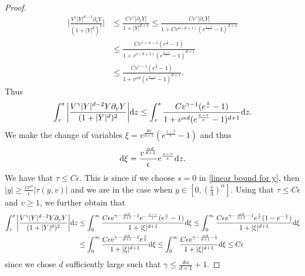 \documentclass[11pt]{article}
\numberwithin{equation}{section}
\newcommand{\der}{\textup{d}}
\begin{document}
\begin{proof}
\begin{align*}
 \bigg|\frac{V^{\gamma}|Y|^{d-1}\partial_{v}Y}{(1+|Y|^{d})^{2}}\bigg|&\leq  \frac{C  v^{\gamma}|\partial_{v}Y|}{1+|Y|^{d+1}}\leq  \frac{C  v^{\gamma}|\partial_{v}Y|}{1+C v^{\alpha (d+1)}(e^{\frac{s-\tau}{\epsilon}}-1)^{d+1}}\\
 &\leq \frac{C  v^{\gamma+\alpha-1}(e^{\frac{s}{\epsilon}}-1)}{1+v^{\alpha (d+1)}(e^{\frac{s-\tau}{\epsilon}}-1)^{d+1}}\\
 &\leq \frac{C  v^{\gamma-1} (e^{\frac{s}{\epsilon}}-1)}{1+ v^{\alpha d}(e^{\frac{s-\tau}{\epsilon}}-1)^{d+1}}.
\end{align*}
Thus
\begin{align*}
\int_{\tau}^{s} \bigg|\frac{V^{\gamma}|Y|^{d-2}Y\partial_{v}Y}{(1+|Y|^{d})^{2}}\bigg|\der z \leq \int_{\tau}^{s}\frac{C  v^{\gamma-1} (e^{\frac{z}{\epsilon}}-1)}{1+ v^{\alpha d}(e^{\frac{z-\tau}{\epsilon}}-1)^{d+1}}\der z.
\end{align*}
We make the change of variables $\xi=v^{\frac{d\alpha }{d+1}}(e^{\frac{z-\tau}{\epsilon}}-1)$ and thus
\begin{align*}
    \der \xi = \frac{v^{\frac{\alpha d}{d+1}}}{\epsilon}e^{\frac{z-\tau}{\epsilon}}\der z.
\end{align*}
We have that  $\tau\leq C\epsilon$. This is since if we choose $s=0$ in \eqref{linear bound for y}, then $|y|\geq \frac{c v^{\alpha}}{\epsilon}| \tau(y,v)|$ and we are in the case when $y\in[0, (\frac{v}{3})^{\alpha}]$. Using that $\tau\leq C\epsilon$ and $v\geq 1$, we further obtain that
\begin{align}\label{bound ii}
\int_{\tau}^{s} \bigg|\frac{V^{\gamma}|Y|^{d-2}Y\partial_{v}Y}{(1+|Y|^{d})^{2}}\bigg|\der z &\leq \int_{0}^{\infty}\frac{C \epsilon  v^{\gamma-\frac{\alpha d}{d+1}-1}e^{-\frac{z-\tau}{\epsilon}}(e^{\frac{z}{\epsilon}}-1) }{1+ |\xi|^{d+1}}\der \xi\leq \int_{0}^{\infty}\frac{C \epsilon  v^{\gamma-\frac{\alpha d}{d+1}-1}e^{\frac{\tau}{\epsilon}}(1-e^{-\frac{z}{\epsilon}}) }{1+ |\xi|^{d+1}}\der \xi\nonumber\\
&\leq \int_{0}^{\infty}\frac{C \epsilon  v^{\gamma-\frac{\alpha d}{d+1}-1}e^{\frac{\tau}{\epsilon}}}{1+ |\xi|^{d+1}}\der \xi\leq\int_{0}^{\infty}\frac{C \epsilon  v^{\gamma-\frac{\alpha d}{d+1}-1}}{1+ |\xi|^{d+1}}\der \xi\leq  C\epsilon
\end{align}
since we chose $d$ sufficiently large such that $\gamma\leq \frac{d\alpha}{d+1}+1$. 




\end{proof}
\end{document}
